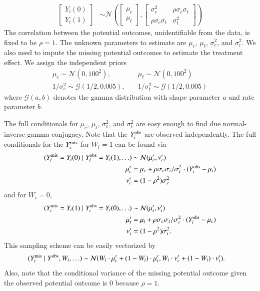 \begin{enumerate}[(a)]
  \begin{align*}
    \begin{bmatrix}
      Y_i(0) \\ Y_i(1)
    \end{bmatrix} &\sim \mathcal{N} 
                    \left(
                    \begin{bmatrix}
                      \mu_c \\ \mu_t
                    \end{bmatrix},
    \begin{bmatrix}
      \sigma_c^2 & \rho \sigma_c \sigma_t \\
      \rho \sigma_c \sigma_t & \sigma_t^2
    \end{bmatrix}
                               \right)
  \end{align*}
  The correlation between the potential outcomes, unidentifiable from
  the data, is fixed to be $\rho = 1$.  The unknown parameters to
  estimate are $\mu_c$, $\mu_t$, $\sigma^2_c$, and $\sigma^2_t$.  We also
  need to impute the missing potential outcomes to estimate the
  treatment effect.  We assign the independent priors
  \begin{align*}
    \mu_c \sim \mathcal{N}(0, 100^2),
    &\quad \mu_t \sim \mathcal{N}(0, 100^2) \\
    1/\sigma^2_c \sim \mathcal{G}(1/2, 0.005),
    &\quad 1/\sigma^2_t \sim \mathcal{G}(1/2, 0.005)
  \end{align*}
  where $\mathcal{G}(a,b)$ denotes the gamma distribution with shape
  parameter $a$ and rate parameter $b$.

  The full conditionals for $\mu_c$, $\mu_t$, $\sigma^2_c$, and
  $\sigma^2_t$ are easy enough to find due normal-inverse gamma
  conjugacy.  Note that the $Y_i^{\text{obs}}$ are observed independently.
  The full conditionals for the $Y_i^{\text{mis}}$ for $W_i = 1$ can be found
  via
  \begin{align*}
    (Y_i^{\text{mis}} = Y_i(0) \mid Y_i^{\text{obs}} = Y_i(1), \ldots)
    &\sim \mathcal{N}(\mu_c', \nu_c') \\
      \mu_c' &= \mu_c + \rho \sigma_c \sigma_t  / \sigma_t^2 \cdot
               (Y_i^{\text{obs}} - \mu_t) \\
    \nu_c'  &= (1 - \rho^2) \sigma^2_c
  \end{align*}
and for $W_i = 0$, 
\begin{align*}
  (Y_i^{\text{mis}} = Y_i(1) \mid Y_i^{\text{obs}} = Y_i(0), \ldots)
  &\sim \mathcal{N}(\mu_t', \nu_t') \\
  \mu_t' &= \mu_t + \rho \sigma_c \sigma_t  / \sigma_c^2 \cdot
           (Y_i^{\text{obs}} - \mu_c) \\
  \nu_t' &= (1 - \rho^2) \sigma^2_t. 
\end{align*}
  This sampling scheme can be easily vectorized by
  \begin{align*}
    (Y^{\text{mis}}_i \mid Y^{\text{obs}}, W_i, \ldots)
    &\sim \mathcal{N}(W_i \cdot \mu_c' + (1 - W_i) \cdot \mu_t',
      W_i \cdot \nu_c' + (1 - W_i) \cdot \nu_t' ).
  \end{align*}
  Also, note that the conditional variance of the missing potential
  outcome given the observed potential outcome is 0 because $\rho=1$.


\end{enumerate}
